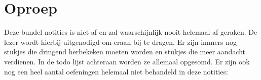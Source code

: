 \documentclass[main.tex]{subfiles}
\begin{document}
\chapter{Oproep}
\label{sec:oproep}

Deze bundel notities is niet af en zal waarschijnlijk nooit helemaal af geraken.
De lezer wordt hierbij uitgenodigd om eraan bij te dragen.
Er zijn immers nog {\Huge\hspace{5px}\hspace{5px}} stukjes die dringend herbekeken moeten worden en {\Huge\hspace{5px}\hspace{5px}} stukjes die meer aandacht verdienen.
In de todo lijst achteraan worden ze allemaal opgesomd.
\newline
Er zijn ook nog een heel aantal oefeningen helemaal niet behandeld in deze notities:\\
\end{document}
